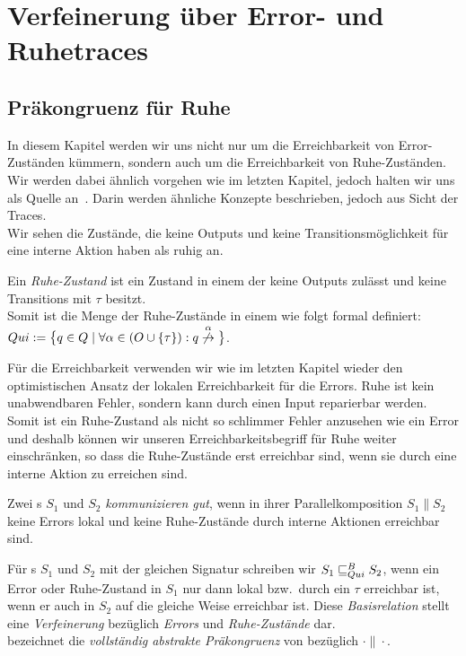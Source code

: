 \chapter{Verfeinerung über Error- und Ruhetraces}

\section{Präkongruenz für Ruhe}

In diesem Kapitel werden wir uns nicht nur um die Erreichbarkeit von
Error-Zuständen kümmern, sondern auch um die Erreichbarkeit von
Ruhe-Zuständen. Wir werden dabei ähnlich vorgehen wie im letzten Kapitel,
jedoch halten wir uns als Quelle an~\cite{Chilton2013}. Darin werden ähnliche
Konzepte beschrieben, jedoch aus Sicht der Traces.\\
Wir sehen die Zustände, die keine Outputs und keine Transitionsmöglichkeit für
eine interne Aktion haben als ruhig an.

\begin{Def}[Ruhe]
  Ein \emph{Ruhe-Zustand} ist ein Zustand in einem \EIO{} der keine
  Outputs zulässt und keine Transitions mit $\tau$ besitzt.\\
  Somit ist die Menge der Ruhe-Zustände in einem \EIO{} wie folgt formal
  definiert: $Qui:=\big\{q\in Q\mid \forall \alpha\in (O\cup \{\tau\}): q
  \overset{\alpha}{\not{\hspace{-0.1cm}\rightarrow}}\big\}$.
\end{Def}

Für die Erreichbarkeit verwenden wir wie im letzten Kapitel wieder den
optimistischen Ansatz der lokalen Erreichbarkeit für die Errors. Ruhe ist kein
unabwendbaren Fehler, sondern kann durch einen Input reparierbar werden. Somit ist
ein Ruhe-Zustand als nicht so \glqq{}schlimmer\grqq{} Fehler anzusehen wie ein Error und
deshalb können wir unseren Erreichbarkeitsbegriff für Ruhe weiter einschränken,
so dass die Ruhe-Zustände erst erreichbar sind, wenn sie durch eine interne
Aktion zu erreichen sind.

\begin{Def}
  Zwei \EIO{}s $S_1$ und $S_2$ \emph{kommunizieren gut}, wenn in ihrer
  Parallelkomposition $S_1\| S_2$ keine Errors lokal und keine Ruhe-Zustände
  durch interne Aktionen erreichbar sind.
\end{Def}

\begin{Def}
  Für \EIO{}s $S_1$ und $S_2$ mit der gleichen Signatur schreiben wir
  $S_1\sqsubseteq _{Qui}^B S_2$, wenn ein Error oder Ruhe-Zustand in $S_1$ nur dann lokal
  bzw.\ durch ein $\tau$ erreichbar ist, wenn er auch in $S_2$ auf die gleiche
  Weise erreichbar ist. Diese \emph{Basisrelation} stellt eine \emph{Verfeinerung}
  bezüglich \emph{Errors} und \emph{Ruhe-Zustände} dar.\\
  \QCRel{} bezeichnet die \emph{vollständig abstrakte Präkongruenz} von
  \QBRel{} bezüglich $\cdot\|\cdot$.
\end{Def}

